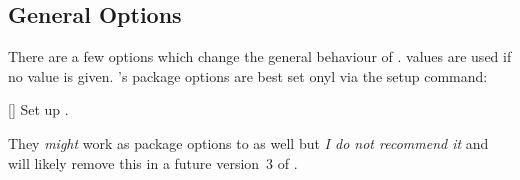 \documentclass{acro-manual}
\begin{document}
\subsection{General Options}
There are a few options which change the general behaviour of \acro.
 values are used if no value is given. \acro's package
options are best set onyl via the setup command:
\begin{commands}
  []
    Set up \acro.
\end{commands}
\begin{bewareofthedog}
  They \emph{might} work as package options to  as well but
  \emph{I do not recommend it} and will likely remove this in a future
  version~3 of \acro.
\end{bewareofthedog}
\end{document}
